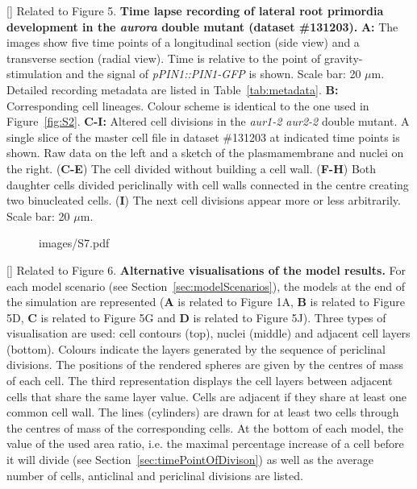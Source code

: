 \clearpage
{}[]{
Related to Figure 5.
{\bf Time lapse recording of lateral root primordia development in the \emph{aurora} double mutant (dataset \#131203).}
{\bf A:} The images show five time points of a longitudinal section (side view) and a transverse section (radial view). Time is relative to the point of gravity-stimulation and the signal of \emph{pPIN1::PIN1-GFP }is shown. Scale bar: 20 $\mu$m. Detailed recording metadata are listed in Table~\ref{tab:metadata}. {\bf B:} Corresponding cell lineages. Colour scheme is identical to the one used in Figure~\ref{fig:S2}. {\bf C-I:} Altered cell divisions in the \emph{aur1-2 aur2-2} double mutant. A single slice of the master cell file in dataset \#131203 at indicated time points is shown. Raw data on the left and a sketch of the plasmamembrane and nuclei on the right. (\textbf{C-E}) The cell divided without building a cell wall. (\textbf{F-H}) Both daughter cells divided periclinally with cell walls connected in the centre creating two binucleated cells. (\textbf{I}) The next cell divisions appear more or less arbitrarily. Scale bar: 20 $\mu$m.
}
\label{fig:S6}
%
\clearpage
%
\begin{figure}[htbp]
\centering
	\begin{overpic}[width=1.\linewidth]{images/S7.pdf}
	\end{overpic}
\end{figure}
\clearpage
{}[]{
Related to Figure 6.
{\bf Alternative visualisations of the model results.} For each model scenario (see Section~\ref{sec:modelScenarios}), the models at the end of the simulation are represented (\textbf{A} is related to Figure 1A, \textbf{B} is related to Figure 5D, \textbf{C} is related to Figure 5G and \textbf{D} is related to Figure 5J). Three types of visualisation are used: cell contours (top), nuclei (middle) and adjacent cell layers (bottom). Colours indicate the layers generated by the sequence of periclinal divisions. The positions of the rendered spheres are given by the centres of mass of each cell. The third representation displays the cell layers between adjacent cells that share the same layer value. Cells are adjacent if they share at least one common cell wall. The lines (cylinders) are drawn for at least two cells through the centres of mass of the corresponding cells. At the bottom of each model, the value of the used area ratio, i.e. the maximal percentage increase of a cell before it will divide (see Section~\ref{sec:timePointOfDivison}) as well as the average number of cells, anticlinal and periclinal divisions are listed.
}
\label{fig:S7}
%
\clearpage


